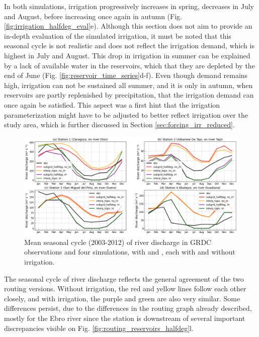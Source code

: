 In both simulations, irrigation progressively increases in spring, decreases in July and August, before increasing once again in autumn (Fig. \ref{fig:irrigation_halfdeg_eval}e). Although this section does not aim to provide an in-depth evaluation of the simulated irrigation, it must be noted that this seasonal cycle is not realistic and does not reflect the irrigation demand, which is highest in July and August. This drop in irrigation in summer can be explained by a lack of available water in the reservoirs, which that they are depleted by the end of June (Fig. \ref{fig:reservoir_time_series}d-f). Even though demand remains high, irrigation can not be sustained all summer, and it is only in autumn, when reservoirs are partly replenished by precipitation, that the irrigation demand can once again be satisfied. This aspect was a first hint that the irrigation parameterization might have to be adjusted to better reflect irrigation over the study area, which is further discussed in Section \ref{sec:forcing_irr_reduced}.

\begin{figure}[htbp]
    \centering
    \includegraphics[width=\textwidth]{images/chap3/river_discharge/halfdeg_4stations_SC.png}
    \caption{Mean seasonal cycle (2003-2012) of river discharge in GRDC observations and four simulations, with \native and \std, each with and without irrigation.}
    \label{fig:halfdeg_stations_SC}
\end{figure}

The seasonal cycle of river discharge reflects the general agreement of the two routing versions. Without irrigation, the red and yellow lines follow each other closely, and with irrigation, the purple and green are also very similar. Some differences persist, due to the differences in the routing graph already described, mostly for the Ebro river since the station is downstream of several important discrepancies visible on Fig. \ref{fig:routing_reservoirs_halfdeg}l.

